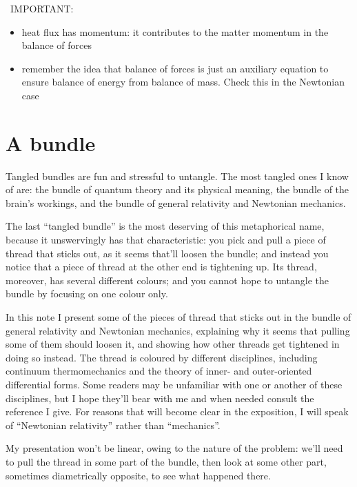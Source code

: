 \documentclass[\ifafour a4paper,12pt,\else a5paper,10pt,\fi%
onecolumn,oneside,article,%
british%
]{memoir}
\theoremstyle{remark}
\theoremstyle{innote}
\renewcommand*{\|}{\nonscript\,\vert\nonscript\;\mathopen{}}
\newcommand*{\puzzle}{{\fontencoding{U}\fontfamily{fontawesometwo}\selectfont\symbol{225}}}
\newcommand{\mynote}[1]{ {\color{notecolour}\puzzle\ #1}}
\begin{document}

\mynote{IMPORTANT:
  \begin{itemize}
  \item heat flux has momentum: it contributes to the matter momentum in
    the balance of forces
  \item remember the idea that balance of forces is just an auxiliary
    equation to ensure balance of energy from balance of mass. Check this
    in the Newtonian case
  \end{itemize}
}

\section{A bundle}
\label{sec:soup}

Tangled bundles are fun and stressful to untangle. The most tangled
ones I know of are: the bundle of quantum theory and its physical meaning,
the bundle of the brain's workings, and the bundle of general relativity
and Newtonian mechanics.

The last \enquote{tangled bundle} is the most deserving of this
metaphorical name, because it unswervingly has that characteristic: you
pick and pull a piece of thread that sticks out, as it seems that'll loosen
the bundle; and instead you notice that a piece of thread at the other end
is tightening up. Its thread, moreover, has several different colours; and
you cannot hope to untangle the bundle by focusing on one colour only.

In this note I present some of the pieces of thread that sticks out in the
bundle of general relativity and Newtonian mechanics, explaining why it
seems that pulling some of them should loosen it, and showing how other
threads get tightened in doing so instead. The thread is coloured by
different disciplines, including continuum thermomechanics and the theory
of inner- and outer-oriented differential forms. Some readers may be
unfamiliar with one or another of these disciplines, but I hope they'll
bear with me and when needed consult the reference I give. For reasons that
will become clear in the exposition, I will speak of \enquote{Newtonian
  relativity} rather than \enquote{mechanics}.

My presentation won't be linear, owing to the nature of the problem: we'll
need to pull the thread in some part of the bundle, then look at some other
part, sometimes diametrically opposite, to see what happened there.
\end{document}

